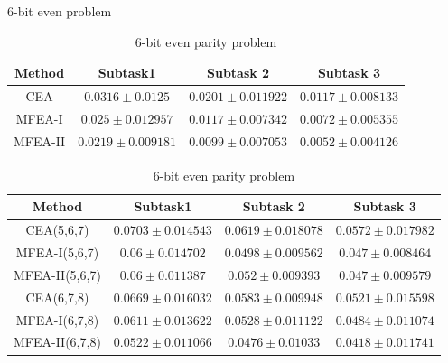 	\begin{frame}{6-bit even problem}
		\begin{table} [H]
        	\caption{Bài 4 bit 1 lớp ẩn}
            \begin{center}
            \begin{tabular}{|c|c|c|c|}
            \hline
            \multirow{1}{*}{\textbf{Method}} & \multicolumn{1}{c|}{\textbf{Subtask1}} & \multicolumn{1}{c|}{\textbf{Subtask 2}} & \multicolumn{1}{c|}{\textbf{Subtask 3}} \\ \hline
            CEA & $0.0316 \pm 0.0125$ & $0.0201 \pm 0.011922$ & $0.0117 \pm 0.008133$ \\
            MFEA-I & $0.025 \pm 0.012957$ & $0.0117 \pm 0.007342$ & $0.0072 \pm 0.005355$\\
            MFEA-II  & $\mathbf{0.0219 \pm 0.009181}$ & $\mathbf{0.0099 \pm 0.007053}$ & $\mathbf{0.0052 \pm 0.004126}$ \\\hline
            
            \end{tabular}
            \end{center}
            
            \label{tab:result:nbit}
            \caption{6-bit even parity problem}
            \begin{center}
            \begin{tabular}{|c|c|c|c|}
            \hline
            \multirow{1}{*}{\textbf{Method}} & \multicolumn{1}{c|}{\textbf{Subtask1}} & \multicolumn{1}{c|}{\textbf{Subtask 2}} & \multicolumn{1}{c|}{\textbf{Subtask 3}} \\ \hline
            CEA(5,6,7)  & $0.0703 \pm 0.014543$ & $0.0619 \pm 0.018078$ & $0.0572 \pm 0.017982$ \\
            MFEA-I(5,6,7)   & $\mathbf{0.06 \pm 0.014702}$ & $\mathbf{0.0498 \pm 0.009562}$ & $0.047 \pm 0.008464$ \\
            MFEA-II(5,6,7)  & $0.06 \pm 0.011387$ & $0.052 \pm 0.009393$ & $\mathbf{0.047 \pm 0.009579}$ \\\hline
            
            CEA(6,7,8)   & $0.0669 \pm 0.016032$ & $0.0583 \pm 0.009948$ & $0.0521 \pm 0.015598$ \\
            MFEA-I(6,7,8)  & $0.0611 \pm 0.013622$ & $0.0528 \pm 0.011122$ & $0.0484 \pm 0.011074$ \\
            MFEA-II(6,7,8) & $\mathbf{0.0522 \pm 0.011066}$ & $\mathbf{0.0476 \pm 0.01033}$ & $\mathbf{0.0418 \pm 0.011741}$ \\\hline
            
            \end{tabular}
            \end{center}
        \end{table}
	\end{frame}
	
